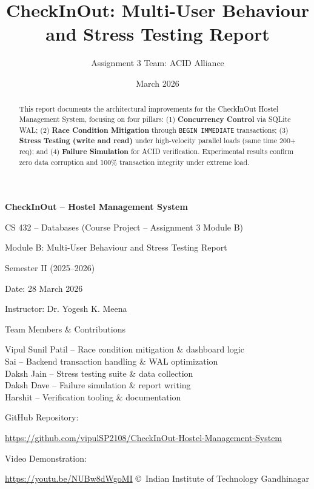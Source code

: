 \documentclass[sigconf]{acmart}
\title{CheckInOut: Multi-User Behaviour and Stress Testing Report}
\author{Assignment 3 Team: ACID Alliance}
\affiliation{%
  \institution{Indian Institute of Technology Gandhinagar}
  \city{Gandhinagar}
  \country{India}
}
\date{March 2026}
\begin{document}
\begin{titlepage}
    \centering
    \vspace*{2cm}
    {\Huge\bfseries CheckInOut -- Hostel Management System\par}
    \vspace{1cm}
    {\Large CS 432 -- Databases (Course Project -- Assignment 3 Module B)\par}
    \vspace{0.5cm}
    {\large Module B: Multi-User Behaviour and Stress Testing Report\par}
    \vspace{1.5cm}
    {\large Semester II (2025--2026)\par}
    \vspace{0.5cm}
    {\large Date: 28 March 2026\par}
    \vfill
    {\large Instructor: Dr. Yogesh K. Meena\par}
    \vspace{1cm}
    {\large Team Members \& Contributions\par}
    \vspace{0.5cm}
    Vipul Sunil Patil -- Race condition mitigation \& dashboard logic\\
    Sai -- Backend transaction handling \& WAL optimization\\
    Daksh Jain -- Stress testing suite \& data collection\\
    Daksh Dave -- Failure simulation \& report writing\\
    Harshit -- Verification tooling \& documentation\\
    \vspace{1cm}
    {\large GitHub Repository:\par}
    \vspace{0.1cm}
    {\small \url{https://github.com/vipulSP2108/CheckInOut-Hostel-Management-System}} \\
    \vspace{0.3cm}
    {\large Video Demonstration:\par}
    \vspace{0.1cm}
    {\small \url{https://youtu.be/NUBw8dWgoMI}}
    \vfill
    {\small \copyright\ Indian Institute of Technology Gandhinagar}
\end{titlepage}

\setcounter{page}{1}

\begin{abstract}
This report documents the architectural improvements for the CheckInOut Hostel Management System, focusing on four pillars: (1) \textbf{Concurrency Control} via SQLite WAL; (2) \textbf{Race Condition Mitigation} through \texttt{BEGIN IMMEDIATE} transactions; (3) \textbf{Stress Testing (write and read)} under high-velocity parallel loads (same time 200+ req); and (4) \textbf{Failure Simulation} for ACID verification. Experimental results confirm zero data corruption and 100\% transaction integrity under extreme load.
\end{abstract}
\end{document}
